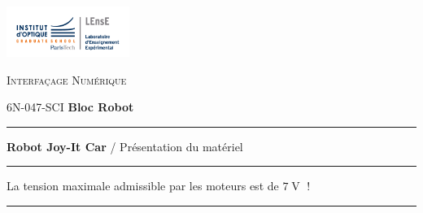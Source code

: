 \documentclass[a4paper,11pt,titlepage]{article} %
\begin{document}
\newpage
\begin{minipage}[c]{.25\linewidth}
	\includegraphics[width=4cm]{images/Logo-LEnsE.png}
\end{minipage} \hfill
\begin{minipage}[c]{.4\linewidth}

\begin{center}
\vspace{0.3cm}
{\Large \textsc{Interfaçage Numérique}}

\medskip

6N-047-SCI \qquad \textbf{\Large Bloc Robot}

\end{center}
\end{minipage}\hfill

\vspace{0.5cm}

\noindent \rule{\linewidth}{1pt}

{\noindent\Large \rule[-7pt]{0pt}{30pt} \textbf{Robot Joy-It Car} / Présentation du matériel}

\noindent \rule{\linewidth}{1pt}

\bigskip

{\LARGE La tension maximale admissible par les moteurs est de $7\operatorname{V}$ !}

\bigskip

\noindent \rule{\linewidth}{1pt}


\end{document}

